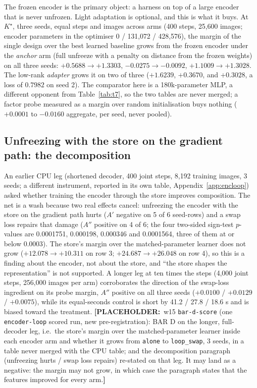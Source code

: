 \documentclass{article} %
\newcommand{\PLACEHOLDER}[1]{{\color{red}\textbf{[PLACEHOLDER:}~#1\textbf{]}}}
\newcommand{\Kstar}{\ensuremath{K^{\star}}}
\begin{document}
The frozen encoder is the primary object: a harness on top of a large encoder that is never
unfrozen. Light adaptation is optional, and this is what it buys. At $\Kstar$, three seeds,
equal steps and images across arms (400 steps, 25,600 images; encoder parameters in the
optimiser 0 / 131,072 / 428,576), the margin of the single design over the best learned
baseline grows from the frozen encoder under the \emph{anchor} arm (full unfreeze with a
penalty on distance from the frozen weights) on all three seeds: $+0.5688\to+1.3303$,
$-0.0275\to-0.0092$, $+1.1009\to+1.3028$. The low-rank \emph{adapter} grows it on two of
three ($+1.6239$, $+0.3670$, and $+0.3028$, a loss of $0.7982$ on seed 2).
The comparator here is a 180k-parameter MLP, a different opponent from Table~\ref{tab:t7}, so
the two tables are never merged; a factor probe measured as a margin over random
initialisation buys nothing ($+0.0001$ to $-0.0160$ aggregate, per seed, never pooled).

\subsection*{Unfreezing with the store on the gradient path: the decomposition}

An earlier CPU leg (shortened decoder, 400 joint steps, 8,192 training images, 3 seeds; a
different instrument, reported in its own table, Appendix~\ref{app:encloop}) asked whether
training the encoder through the store improves composition. The net is a wash because two
real effects cancel: unfreezing the encoder with the store on the gradient path hurts ($A'$
negative on 5 of 6 seed-rows) and a swap loss repairs that damage ($A''$ positive on 4 of 6;
the four two-sided sign-test $p$-values are 0.0001751, 0.000198, 0.000346 and 0.0001564, three
of them at or below 0.0003). The store's margin over
the matched-parameter learner does not grow ($+12.078\to+10.311$ on row 3; $+24.687\to+26.048$
on row 4), so this is a finding about the encoder, not about the store, and ``the store shapes
the representation'' is not supported. %
A longer leg at ten times the steps (4,000 joint steps, 256,000 images per arm) corroborates
the direction of the swap-loss ingredient on its probe margin, $A''$ positive on all three
seeds ($+0.0100$ / $+0.0129$ / $+0.0075$), while its equal-seconds control is short by 41.2 /
27.8 / 18.6 s and is biased toward the treatment. %
\PLACEHOLDER{w15 \texttt{bar-d-score} (one \texttt{encoder-loop} scored run, new
pre-registration): BAR D on the longer, full-decoder leg, i.e.\ the store's margin over the
matched-parameter learner inside each encoder arm and whether it grows from \texttt{alone} to
\texttt{loop\_swap}, 3 seeds, in a table never merged with the CPU table; and the decomposition
paragraph (unfreezing hurts / swap loss repairs) re-stated on that leg. It may land as a
negative: the margin may not grow, in which case the paragraph states that the features
improved for every arm.}
\end{document}
